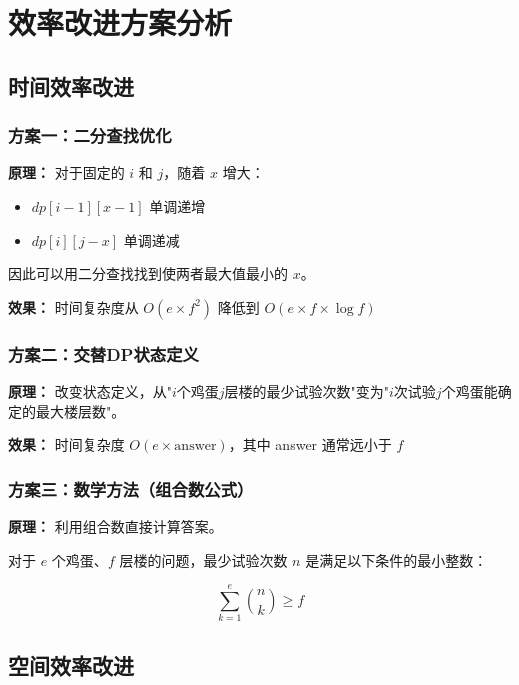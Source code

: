 \documentclass[12pt,a4paper]{article}
\begin{document}
\section{效率改进方案分析}

\subsection{时间效率改进}

\subsubsection{方案一：二分查找优化}

\textbf{原理：} 对于固定的 $i$ 和 $j$，随着 $x$ 增大：
\begin{itemize}
    \item $dp[i-1][x-1]$ 单调递增
    \item $dp[i][j-x]$ 单调递减
\end{itemize}

因此可以用二分查找找到使两者最大值最小的 $x$。

\textbf{效果：} 时间复杂度从 $O(e \times f^2)$ 降低到 $O(e \times f \times \log f)$

\subsubsection{方案二：交替DP状态定义}

\textbf{原理：} 改变状态定义，从"$i$个鸡蛋$j$层楼的最少试验次数"变为"$i$次试验$j$个鸡蛋能确定的最大楼层数"。

\textbf{效果：} 时间复杂度 $O(e \times \text{answer})$，其中 answer 通常远小于 $f$

\subsubsection{方案三：数学方法（组合数公式）}

\textbf{原理：} 利用组合数直接计算答案。

对于 $e$ 个鸡蛋、$f$ 层楼的问题，最少试验次数 $n$ 是满足以下条件的最小整数：

\begin{equation}
\sum_{k=1}^{e} \binom{n}{k} \geq f
\end{equation}

\subsection{空间效率改进}
\end{document}

